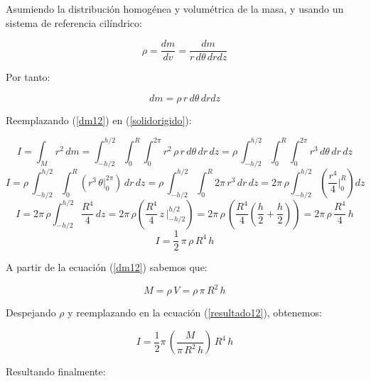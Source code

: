 \documentclass[letter,oneside,11pt]{article}
\begin{document}
Asumiendo la distribución homogénea y volumétrica de la masa, y usando un
sistema de referencia cilíndrico:

\begin{equation*}
    \rho = \frac{dm}{dv} = \frac{dm}{r\, d\theta\, dr dz}
\end{equation*}

Por tanto:

\begin{equation}
    dm = \rho\, r\, d\theta\, dr dz
\label{dm12}
\end{equation}

Reemplazando (\ref{dm12}) en (\ref{solidorigido}):

\begin{equation*}
    I = \int_{M} r^2\, dm = \int_{-h/2}^{h/2} \int_{0}^{R} \int_{0}^{2\pi} r^2\, \rho\, r\, d\theta\, dr\, dz = \rho\, \int_{-h/2}^{h/2} \int_{0}^{R} \int_{0}^{2\pi} r^3\, d\theta\, dr\, dz
\end{equation*}
\begin{equation*}
    I = \rho\, \int_{-h/2}^{h/2} \int_{0}^{R} (r^3\, \theta \Biggr|_{0}^{2\pi})\, dr\, dz = \rho\, \int_{-h/2}^{h/2} \int_{0}^{R} 2\pi\, r^3\, dr\, dz = 2\pi\, \rho \int_{-h/2}^{h/2} \left(\frac{r^4}{4}\Biggr|_{0}^{R}\right) dz
\end{equation*}
\begin{equation*}
    I = 2\pi\, \rho \int_{-h/2}^{h/2} \frac{R^4}{4}\, dz = 2\pi\, \rho \left(\frac{R^4}{4}\, z\,\Biggr|_{-h/2}^{h/2}\right) = 2\pi\, \rho\, \left( \frac{R^4}{4} \left( \frac{h}{2} + \frac{h}{2} \right)  \right) = 2\pi\, \rho\, \frac{R^4}{4}\, h
\end{equation*}
\begin{equation}
    I = \frac{1}{2}\, \pi\, \rho\, R^4\, h
\label{resultado12}
\end{equation}

A partir de la ecuación (\ref{dm12}) sabemos que:

\begin{equation*}
    M = \rho\, V = \rho\, \pi\, R^2\, h
\end{equation*}

Despejando $\rho$ y reemplazando en la ecuación (\ref{resultado12}), obtenemos:

\begin{equation*}
    I = \frac{1}{2} \pi\, (\frac{M}{\pi\, R^2\, h})\, R^4\, h
\end{equation*}

Resultando finalmente:
\end{document}

